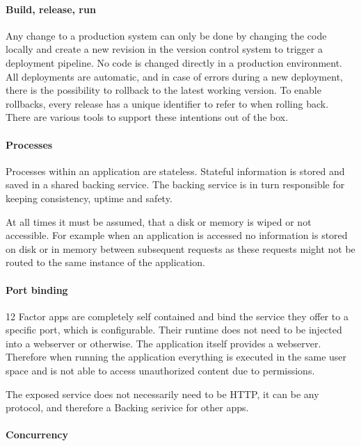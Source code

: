 \paragraph{Build, release, run}

Any change to a production system can only be done by changing the code locally
and create a new revision in the version control system to trigger a deployment
pipeline. No code is changed directly in a production environment. All
deployments are automatic, and in case of errors during a new deployment, there
is the possibility to rollback to the latest working version. To enable
rollbacks, every release has a unique identifier to refer to when rolling back.
There are various tools to support these intentions out of the box.

\paragraph{Processes}

Processes within an application are stateless. Stateful information is stored
and saved in a shared backing service. The backing service is in turn
responsible for keeping consistency, uptime and safety.

At all times it must be assumed, that a disk or memory is wiped or not
accessible. For example when an application is accessed no information is
stored on disk or in memory between subsequent requests as these requests might
not be routed to the same instance of the application.

\paragraph{Port binding}

12 Factor apps are completely self contained and bind the service they offer to
a specific port, which is configurable. Their runtime does not need to be
injected into a webserver or otherwise. The application itself provides a
webserver.  Therefore when running the application everything is executed in
the same user space and is not able to access unauthorized content due to
permissions.

The exposed service does not necessarily need to be HTTP, it can be any
protocol, and therefore a Backing serivice for other apps.

\paragraph{Concurrency}

